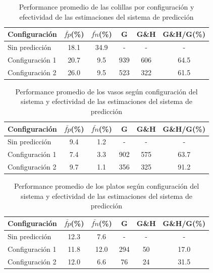 \begin{table}[htb]
  \begin{tabular}{|l | c | c | c | c | c|}
	\hline  
	\textbf{Configuración} & \textbf{$\bar{fp}$(\%)} &  
	\textbf{$\bar{fn}$(\%)}& \textbf{G} &  \textbf{G\&H} &  \textbf{G\&H/G(\%)} \\
	\hline
	\hline
	Sin predicción  & 18.1 & 34.9 & - & - & - \\
	\hline
	Configuración 1 & 20.7 & 9.5 & 939 & 606 & 64.5  \\
	\hline
	Configuración 2 & 26.0 & 9.5 & 523 & 322 & 61.5 \\
	\hline
	\end{tabular}
	\caption{\label{tab:evo_colillas} Performance promedio de las colillas 
	por configuración y  efectividad de las estimaciones del sistema de predicción}
\end{table}

\begin{table}[htb]
  \begin{tabular}{|l | c | c | c | c | c|}
	\hline
	\textbf{Configuración} & \textbf{$\bar{fp}$(\%)} &  \textbf{$\bar{fn}$(\%)}& \textbf{G} &  \textbf{G\&H} &  \textbf{G\&H/G(\%)} \\
	\hline
	\hline
	Sin predicción  & 9.4 & 1.2 & - & - & -\\
	\hline
	Configuración 1 & 7.4 &	3.3 & 902 & 575 & 63.7 \\
	\hline
	Configuración 2 & 9.7 &	1.1 & 356 & 325 & 91.2\\
	\hline
	\end{tabular}
	\caption{\label{tab:evo_vasos} Performance promedio de los vasos según configuración del 
	sistema y efectividad de las estimaciones del sistema de predicción}
\end{table}



\begin{table}[htb]
  \begin{tabular}{|l | c | c | c | c | c|}
	\hline
	\textbf{Configuración} & \textbf{$\bar{fp}$(\%)} &  \textbf{$\bar{fn}$(\%)}& \textbf{G} &  \textbf{G\&H} &  \textbf{G\&H/G(\%)} \\
	\hline
	\hline
	Sin predicción &  12.3 & 7.6 & - & - & -\\
	\hline
	Configuración 1 & 11.8 & 12.0 & 294 & 50 & 17.0\\
	\hline
	Configuración 2 & 12.0 & 6.6 & 76 & 24 & 31.5 \\
	\hline
	\end{tabular}
	\caption{\label{tab:evo_platos} Performance promedio de los platos según configuración del 
	sistema y efectividad de las estimaciones del sistema de predicción}
\end{table}


